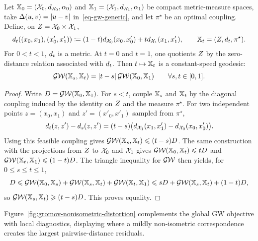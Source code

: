 \begin{prop}\label{prop-gw-geodesics}
	Let $\mathbb{X}_0=(\mathcal{X}_0,d_{\mathcal{X}_0},\alpha_0)$ and $\mathbb{X}_1=(\mathcal{X}_1,d_{\mathcal{X}_1},\alpha_1)$ be compact metric-measure spaces, take $\Delta(u,v)=|u-v|$ in~\eqref{eq-gw-generic}, and let $\pi^\star$ be an optimal coupling. Define, on $Z=\mathcal{X}_0\times\mathcal{X}_1$,
	\[
		d_t((x_0,x_1),(x'_0,x'_1))
		\coloneqq
		(1-t)d_{\mathcal{X}_0}(x_0,x'_0)+td_{\mathcal{X}_1}(x_1,x'_1),
		\qquad
		\mathbb{X}_t=(Z,d_t,\pi^\star).
	\]
	For $0<t<1$, $d_t$ is a metric. At $t=0$ and $t=1$, one quotients $Z$ by the zero-distance relation associated with $d_t$. Then $t\mapsto\mathbb{X}_t$ is a constant-speed geodesic:
	\[
		\operatorname{\mathcal{GW}}(\mathbb{X}_s,\mathbb{X}_t)=|t-s|\operatorname{\mathcal{GW}}(\mathbb{X}_0,\mathbb{X}_1)
		\qquad
		\forall s,t\in[0,1].
	\]
\end{prop}

\begin{proof}
	Write $D=\operatorname{\mathcal{GW}}(\mathbb{X}_0,\mathbb{X}_1)$. For $s<t$, couple $\mathbb{X}_s$ and $\mathbb{X}_t$ by the diagonal coupling induced by the identity on $Z$ and the measure $\pi^\star$. For two independent points $z=(x_0,x_1)$ and $z'=(x'_0,x'_1)$ sampled from $\pi^\star$,
	\[
		d_t(z,z')-d_s(z,z')
		=
		(t-s)\big(d_{\mathcal{X}_1}(x_1,x'_1)-d_{\mathcal{X}_0}(x_0,x'_0)\big).
	\]
	Using this feasible coupling gives $\operatorname{\mathcal{GW}}(\mathbb{X}_s,\mathbb{X}_t)\leqslant(t-s)D$. The same construction with the projections from $Z$ to $\mathcal{X}_0$ and $\mathcal{X}_1$ gives $\operatorname{\mathcal{GW}}(\mathbb{X}_0,\mathbb{X}_t)\leqslant tD$ and $\operatorname{\mathcal{GW}}(\mathbb{X}_t,\mathbb{X}_1)\leqslant(1-t)D$. The triangle inequality for $\operatorname{\mathcal{GW}}$ then yields, for $0\leq s\leq t\leq1$,
	\[
		D
		\leqslant
		\operatorname{\mathcal{GW}}(\mathbb{X}_0,\mathbb{X}_s)+\operatorname{\mathcal{GW}}(\mathbb{X}_s,\mathbb{X}_t)+\operatorname{\mathcal{GW}}(\mathbb{X}_t,\mathbb{X}_1)
		\leqslant
		sD+\operatorname{\mathcal{GW}}(\mathbb{X}_s,\mathbb{X}_t)+(1-t)D,
	\]
	so $\operatorname{\mathcal{GW}}(\mathbb{X}_s,\mathbb{X}_t)\geqslant(t-s)D$. This proves equality.
\end{proof}

Figure~\ref{fig:gromov-nonisometric-distortion} complements the global GW objective with local diagnostics, displaying where a mildly non-isometric correspondence creates the largest pairwise-distance residuals.


